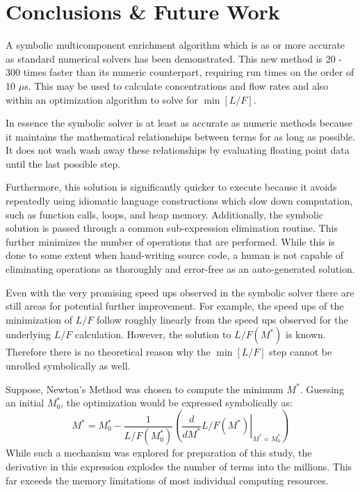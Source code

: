 \documentclass[preprint,12pt]{elsarticle}
\newcommand{\us}[0]{$\mu$s}
\begin{document}
\section{Conclusions \& Future Work}
\label{sec:conc}

A symbolic multicomponent enrichment algorithm which is as or more accurate as 
standard numerical solvers has been demonstrated.  This new method is 20 - 300
times faster than its numeric counterpart, requiring run times on the order of 10 \us.
This may be used to calculate concentrations and flow rates and also within an 
optimization algorithm to solve for $\min\left[L/F\right]$.

In essence the symbolic solver is at least as accurate as numeric methods because
it maintains the mathematical relationships between terms for as long as possible.
It does not wash wash away these relationships by evaluating floating point data
until the last possible step.

Furthermore, this solution is significantly quicker to execute because it avoids
repeatedly using idiomatic language constructions which slow down computation, such
as function calls, loops, and heap memory.  Additionally, the symbolic solution is
passed through a common sub-expression elimination routine.  This further minimizes
the number of operations that are performed.  While this is done to some extent when 
hand-writing source code, a human is not capable of eliminating operations as 
thoroughly and error-free as an auto-generated solution.

Even with the very promising speed ups observed in the symbolic solver there are 
still areas for potential further improvement.  For example, the speed ups of the 
minimization of $L/F$ follow roughly linearly from the speed ups observed for the
underlying $L/F$ calculation.  However, the solution to $L/F(M^*)$ is known.
Therefore there is no theoretical reason why the $\min\left[L/F\right]$ step 
cannot be unrolled symbolically as well.

Suppose, Newton's Method was chosen to compute the minimum $M^*$.  Guessing 
an initial $M_0^*$, the optimization would be expressed symbolically as:
\begin{equation}
M^* = M_0^* - \frac{1}{L/F(M_0^*)}\left(\left.\frac{d}{dM^*}L/F(M^*)\right|_{M^*=M_0^*}\right)
\end{equation}
While such a mechanism was explored for preparation of this study, the derivative
in this expression explodes the number of terms into the millions.  This far exceeds
the memory limitations of most individual computing resources.  
\end{document}
